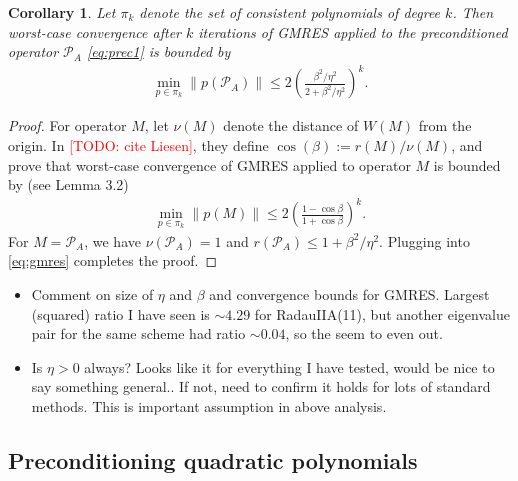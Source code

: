 \documentclass[a4paper,10pt]{article}
\makeatletter
\newtheorem{corollary}{Corollary}
\newcommand{\todo}[1]{\textcolor{red}{[TODO\@: #1]}}
\makeatother
\begin{document}
%
\begin{corollary}\label{cor:gmres}
Let $\pi_k$ denote the set of consistent polynomials of degree $k$. Then worst-case convergence
after $k$ iterations of GMRES applied to the preconditioned operator $\mathcal{P}_A$ \eqref{eq:prec1}
is bounded by
\begin{align*}
\min_{p\in\pi_k} \|p(\mathcal{P}_A)\| \leq 2\left(\frac{\beta^2/\eta^2}{2 + \beta^2/\eta^2}\right)^k.
\end{align*}
\end{corollary}
\begin{proof}
For operator $M$, let $\nu(M)$ denote the distance of $W(M)$ from the origin. In \todo{cite Liesen},
they define $\cos(\beta) := r(M) / \nu(M)$, and prove that worst-case convergence of GMRES applied
to operator $M$ is bounded by (see Lemma 3.2)
%
\begin{align}\label{eq:gmres}
\min_{p\in\pi_k} \|p(M)\| \leq 2\left(\frac{1-\cos\beta}{1+\cos\beta}\right)^k.
\end{align}
%
For $M = \mathcal{P}_A$, we have $\nu(\mathcal{P}_A)= 1$ and $r(\mathcal{P}_A) \leq 1+\beta^2/\eta^2$.
Plugging into \eqref{eq:gmres} completes the proof. 
\end{proof}
%

{\color{blue}
\begin{itemize}
	\item Comment on size of $\eta$ and $\beta$ and convergence bounds for GMRES. Largest (squared)
	ratio I have seen is $\sim 4.29$ for RadauIIA(11), but another eigenvalue pair for the same
	scheme had ratio $\sim 0.04$, so the seem to even out.

	\item Is $\eta > 0$ always? Looks like it for everything I have tested, would be nice to
	say something general.. If not, need to confirm it holds for lots of standard methods.
	This is important assumption in above analysis.

\end{itemize}
}

\subsection{Preconditioning quadratic polynomials}
\end{document}
